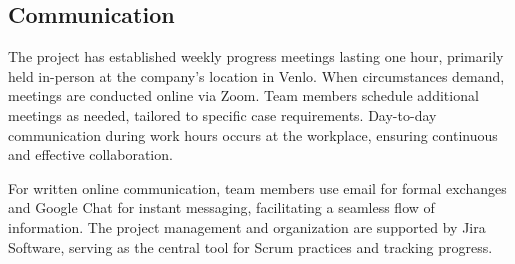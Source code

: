 \documentclass[12pt,a4paper]{article}
\begin{document}
\subsection{Communication}
The project has established weekly progress meetings lasting one hour, primarily held in-person at the company's location in Venlo. When circumstances demand, meetings are conducted online via Zoom. Team members schedule additional meetings as needed, tailored to specific case requirements. Day-to-day communication during work hours occurs at the workplace, ensuring continuous and effective collaboration. \vspace{1em} %

For written online communication, team members use email for formal exchanges and Google Chat for instant messaging, facilitating a seamless flow of information. The project management and organization are supported by Jira Software, serving as the central tool for Scrum practices and tracking progress.

\newpage
\end{document}
